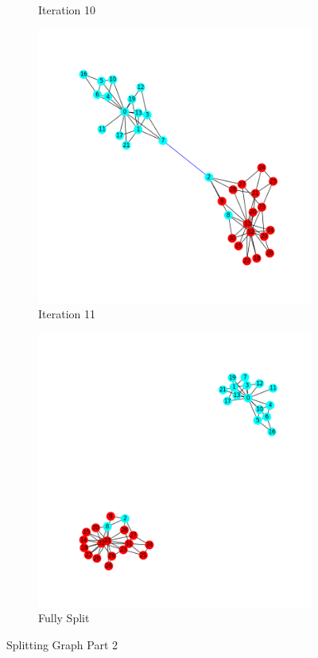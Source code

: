 \documentclass[11pt]{article} %
\begin{document}
\begin{figure}[h!]
\begin{subfigure}[b]{0.4\linewidth}
    \caption{Iteration 10}
  \end{subfigure}
  \begin{subfigure}[b]{0.4\linewidth}
    \includegraphics[width=\linewidth]{../Figures/Iteration11.png}
    \caption{Iteration 11}
  \end{subfigure}
  \begin{subfigure}[b]{0.4\linewidth}
    \includegraphics[width=\linewidth]{../Figures/SplitComponents.png}
    \caption{Fully Split}
  \end{subfigure}
\caption{Splitting Graph Part 2}
  \label{../Figures/Iteration1.png}
\end{figure}
\end{document}

